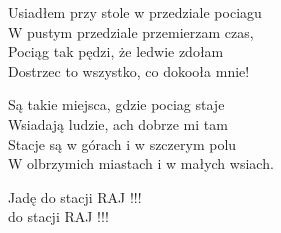 \begin{text}
    Usiadłem przy stole w przedziale pociagu\\
    W pustym przedziale przemierzam czas,\\
    Pociąg tak pędzi, że ledwie zdołam\\
    Dostrzec to wszystko, co dokooła mnie!

    Są takie miejsca, gdzie pociag staje\\
    Wsiadają ludzie, ach dobrze mi tam\\
    Stacje są w górach i w szczerym polu\\
    W olbrzymich miastach i w małych wsiach.

    Jadę do stacji RAJ !!!\\
    do stacji RAJ !!!
\end{text}
\begin{chord}

\end{chord}